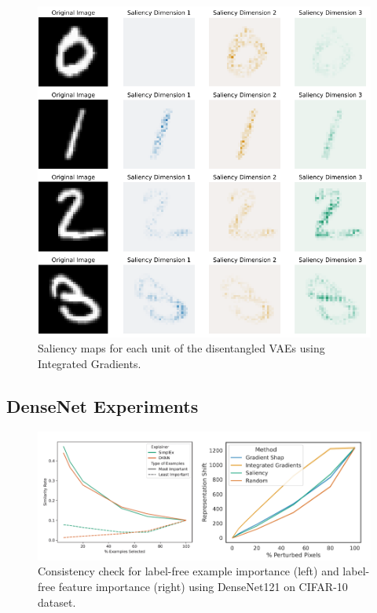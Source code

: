 \begin{figure}[H]
    \centering
    \includegraphics[width=12cm]{images/vae_integrated_grads_qualiative.png}
    \caption{Saliency maps for each unit of the disentangled VAEs using Integrated Gradients.}
    \label{fig:vae_integrated_grads_qualitative}
\end{figure}


\subsection{DenseNet Experiments}
 \begin{figure}[H]
    \includegraphics[width=13cm]{images/cifar_densenet.png}
    \caption{ Consistency check for label-free example importance (left) and label-free feature importance (right) using DenseNet121 on CIFAR-10 dataset. }
    \label{fig:cifar_densenet}
\end{figure}

